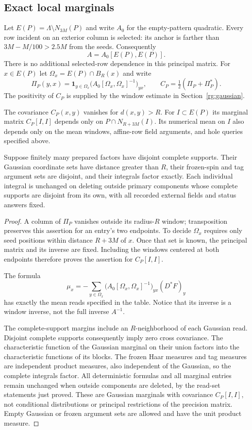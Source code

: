 \subsection{Exact local marginals}

Let $E(P)=\Lambda\setminus N_{3M}(P)$ and write $A_0$ for the
empty-pattern quadratic.  Every row incident on an exterior column is
selected: its anchor is farther than $3M-M/100>2.5M$ from the seeds.
Consequently
\[
 A=A_0[E(P),E(P)].
\]
There is no additional selected-row dependence in this principal matrix.
For $x\in E(P)$ let $\Omega_x=E(P)\cap B_R(x)$ and write
\[
 \Pi_P(y,x)=\mathbf1_{y\in\Omega_x}
       \bigl(A_0[\Omega_x,\Omega_x]^{-1}\bigr)_{yx},
 \qquad C_P=\tfrac12(\Pi_P+\Pi_P^*).
\]
The positivity of $C_P$ is supplied by the window estimate in
Section~\ref{rg:gaussian}.

\begin{lemma}
\label{app:local-marginals}
The covariance $C_P(x,y)$ vanishes for $d(x,y)>R$.  For
$I\subset E(P)$ its marginal matrix $C_P[I,I]$ depends only on
$P\cap N_{R+3M}(I)$.  Its numerical mean on $I$ also depends only
on the mean windows, affine-row field arguments, and hole queries
specified above.

Suppose finitely many prepared factors have disjoint complete supports.
Their Gaussian coordinate sets have distance greater than $R$, their
frozen-spin and tag argument sets are disjoint, and their integrals
factor exactly.  Each individual integral is unchanged on deleting
outside primary components whose complete supports are disjoint from
its own, with all recorded external fields and status answers fixed.
\end{lemma}
\begin{proof}
A column of $\Pi_P$ vanishes outside its radius-$R$ window;
transposition preserves this assertion for an entry's two endpoints.
To decide $\Omega_x$ requires only seed positions within distance
$R+3M$ of $x$.  Once that set is known, the principal matrix and its
inverse are fixed.  Including the windows centered at both endpoints
therefore proves the assertion for $C_P[I,I]$.

The formula
\[
 \mu_x=-\sum_{y\in\Omega_x}
      \bigl(A_0[\Omega_x,\Omega_x]^{-1}\bigr)_{yx}(D^*F)_y
\]
has exactly the mean reads specified in the table.  Notice that its
inverse is a window inverse, not the full inverse $A^{-1}$.

The complete-support margins include an $R$-neighborhood of each
Gaussian read.  Disjoint complete supports consequently imply zero
cross covariance.  The characteristic function of the Gaussian
marginal on their union factors into the characteristic functions of
its blocks.  The frozen Haar measures and tag measures are independent
product measures, also independent of the Gaussian, so the complete
integrals factor.  All deterministic formulas and all marginal entries
remain unchanged when outside components are deleted, by the read-set
statements just proved.  These are Gaussian marginals with covariance
$C_P[I,I]$, not conditional distributions or principal restrictions of
the precision matrix.  Empty Gaussian or frozen argument sets are
allowed and have the unit product measure.
\end{proof}

